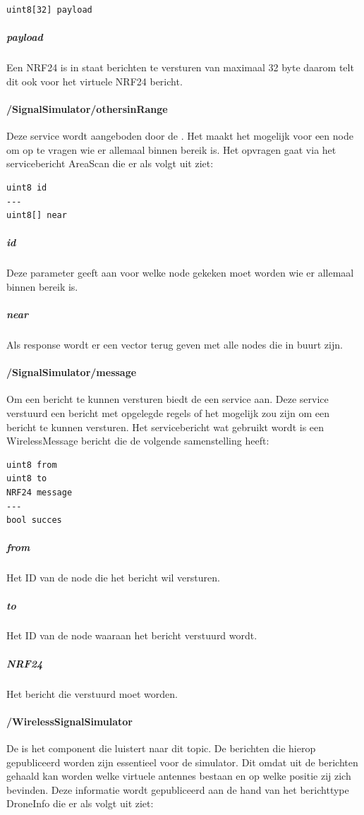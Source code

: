 \documentclass[a4paper, 11pt, oneside]{report}
\begin{document}
\begin{lstlisting} 
uint8[32] payload
\end{lstlisting}

\subparagraph{payload} Een NRF24 is in staat berichten te versturen van maximaal 32 byte daarom telt dit ook voor het virtuele NRF24 bericht.


\paragraph{/SignalSimulator/othersinRange}
\label{DetailedDesign:ros:intern:rosinterfaces:service:ss:range}
Deze service wordt aangeboden door de .
Het maakt het mogelijk voor een node om op te vragen wie er allemaal binnen bereik is.
Het opvragen gaat via het servicebericht AreaScan die er als volgt uit ziet:

\begin{lstlisting}
uint8 id
---
uint8[] near
\end{lstlisting}

\subparagraph{id} Deze parameter geeft aan voor welke node gekeken moet worden wie er allemaal binnen bereik is.
\subparagraph{near} Als response wordt er een vector terug geven met alle nodes die in buurt zijn.

\paragraph{/SignalSimulator/message}
\label{DetailedDesign:ros:intern:rosinterfaces:service:ss:message}
Om een bericht te kunnen versturen biedt de   een service aan. 
Deze service verstuurd een bericht met opgelegde regels of het mogelijk zou zijn om een bericht te kunnen versturen.
Het servicebericht wat gebruikt wordt is een WirelessMessage bericht die de volgende samenstelling heeft:

\begin{lstlisting}
uint8 from
uint8 to 
NRF24 message
---
bool succes
\end{lstlisting}

\subparagraph{from} Het ID van de node die het bericht wil versturen.
\subparagraph{to} Het ID van de node waaraan het bericht verstuurd wordt.
\subparagraph{NRF24} Het bericht die verstuurd moet worden.


\paragraph{/WirelessSignalSimulator}
\label{DetailedDesign:ros:intern:rosinterfaces:topic:signalsimulator}
De  is het component die luistert naar dit topic. 
De berichten die hierop gepubliceerd worden zijn essentieel voor de simulator.
Dit omdat uit de berichten gehaald kan worden welke virtuele antennes bestaan en op welke positie zij zich bevinden.
Deze informatie wordt gepubliceerd aan de hand van het berichttype DroneInfo die er als volgt uit ziet:
\end{document}
